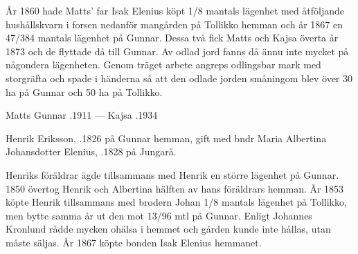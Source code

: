 År 1860 hade Matts' far Isak Elenius köpt 1/8 mantals lägenhet med åtföljande hushållskvarn i forsen nedanför mangården på Tollikko hemman och år 1867 en 47/384 mantals lägenhet på Gunnar. Dessa två fick Matts och Kajsa överta år 1873 och de flyttade då till Gunnar. Av odlad jord fanns då ännu inte mycket på någondera lägenheten. Genom träget arbete angreps odlingsbar mark med storgräfta och spade i händerna så att den odlade jorden småningom blev över 30 ha på Gunnar och 50 ha på Tollikko.

Matts Gunnar .1911  ---  Kajsa .1934


%
Henrik Eriksson, .1826 på Gunnar hemman, gift med bndr Maria Albertina Johansdotter Elenius, .1828 på Jungarå.
\begin{jhchildren}
  \item {}
  \item {}
  \item {}
  \item {}
  \item {}
  \item {}
  \item {}
  \item {}
  \item {}
  \item {}
\end{jhchildren}

Henriks föräldrar ägde tillsammans med Henrik en större lägenhet på Gunnar. 1850 övertog Henrik och Albertina hälften av hans föräldrars hemman. År 1853 köpte Henrik tillsammans med brodern Johan 1/8 mantals lägenhet på Tollikko, men bytte samma år ut den mot 13/96 mtl på Gunnar. Enligt Johannes Kronlund rådde mycken ohälsa i hemmet och gården kunde inte hållas, utan måste säljas. År 1867 köpte bonden Isak Elenius hemmanet.

